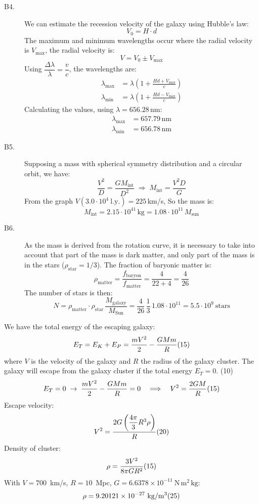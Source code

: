 \begin{description}
\item[B4.] We can estimate the recession velocity of the galaxy using
  Hubble's law:
  \[ V_0 = H\cdot d \]
  The maximum and minimum wavelengths occur where the radial velocity is
  $V_{\mathrm{max}}$, the radial velocity is:
  \[ V = V_0 \pm V_{\mathrm{max}} \]
  Using $\dfrac{\Delta\lambda}{\lambda} = \dfrac{v}{c}$, the wavelengths are:
  \begin{align*}
    \lambda_{\mathrm{max}} &= \lambda\left(1
      + \frac{Hd + V_{\mathrm{max}}}{c}\right) \\
    \lambda_{\mathrm{min}} &= \lambda\left(1
      + \frac{Hd - V_{\mathrm{max}}}{c}\right)
  \end{align*}
  Calculating the values, using $\lambda = 656.28$\,nm:
  \begin{align*}
    \lambda_{\mathrm{max}} &= 657.79\,\mathrm{nm} \\
    \lambda_{\mathrm{min}} &= 656.78\,\mathrm{nm}
  \end{align*}

\item[B5.] Supposing a mass with spherical symmetry distribution and a
  circular orbit, we have:
  \[ \frac{V^2}{D} = \frac{G M_{\mathrm{int}}}{D^2} \;\Rightarrow\;
     M_{\mathrm{int}} = \frac{V^2 D}{G} \]
  From the graph $V(3.0\cdot 10^{4}\ \mathrm{l.y.}) = 225$\,km/s, So the mass
  is:
  \[ M_{\mathrm{int}} = 2.15\cdot 10^{41}\,\mathrm{kg}
     = 1.08\cdot 10^{11}\,M_{\mathrm{sun}} \]

\item[B6.] As the mass is derived from the rotation curve, it is necessary to
  take into account that part of the mass is dark matter, and only part of the
  mass is in the stars ($\rho_{\mathrm{star}} = 1/3$). The fraction of
  baryonic matter is:
  \[ \rho_{\mathrm{matter}} = \frac{f_{\mathrm{baryon}}}{f_{\mathrm{matter}}}
     = \frac{4}{22+4} = \frac{4}{26} \]
  The number of stars is then:
  \[ N = \rho_{\mathrm{matter}}\cdot\rho_{\mathrm{star}}\,
     \frac{M_{\mathrm{galaxy}}}{M_{\mathrm{Sun}}}
     = \frac{4}{26}\,\frac{1}{3}\,1.08\cdot 10^{11}
     = 5.5\cdot 10^{9}\ \text{stars} \]
\end{description}

We have the total energy of the escaping galaxy:
\[
E_T = E_K + E_P = \frac{mV^2}{2} - \frac{GMm}{R}
\hfill(15)
\]
where $V$ is the velocity of the galaxy and $R$ the radius of the galaxy
cluster. The galaxy will escape from the galaxy cluster if the total energy
$E_T = 0$. \hfill(10)
\[
E_T = 0 \;\rightarrow\; \frac{mV^2}{2} - \frac{GMm}{R} = 0
\quad\Longrightarrow\quad
V^2 = \frac{2GM}{R}
\hfill(15)
\]
Escape velocity:
\[
V^2 = \frac{2G\left(\dfrac{4\pi}{3}R^3\rho\right)}{R}
\hfill(20)
\]
Density of cluster:
\[
\rho = \frac{3V^2}{8\pi G R^2}
\hfill(15)
\]
With $V = 700$~km/s, $R = 10$~Mpc,
$G = 6.6378 \times 10^{-11}~\mathrm{N\,m^2\,kg}$:
\[
\rho = 9.20121 \times 10^{-27}~\mathrm{kg/m^3}
\hfill(25)
\]


